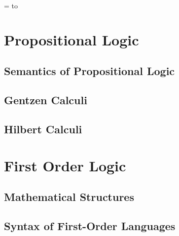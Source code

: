 \vfill\break

\color{black}


\newif\ifpageodd
\pageoddtrue
\headline={%
    \hbox to \hsize{\color{black}%
        \ifpageodd\hfil{\it\currsubsection\quad\bf\folio}\global\pageoddfalse%
        \else{\bf\folio\quad\it\currsubsection}\hfil\global\pageoddtrue\fi%
    }%
}

\section{Propositional Logic}

\subsection{Semantics of Propositional Logic}



\subsection{Gentzen Calculi}



\subsection{Hilbert Calculi}



\vfill\break

\section{First Order Logic}

\subsection{Mathematical Structures}



\subsection{Syntax of First-Order Languages}




